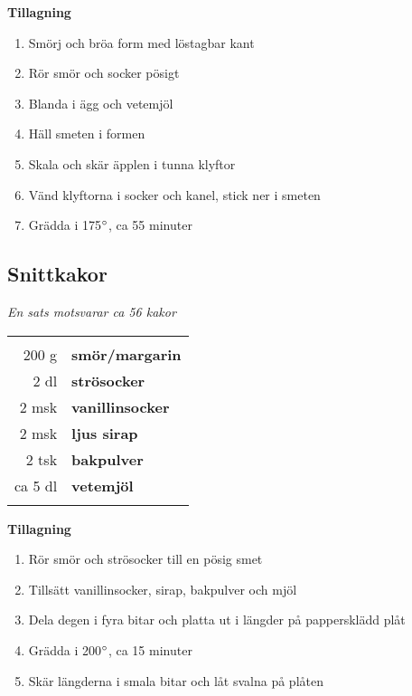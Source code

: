 \documentclass[a4paper,12pt]{article}
\newcommand{\sats}[1]{\noindent \textit{En sats motsvarar #1}}
\begin{document}
\begin{multicols*}{2}

\noindent \textbf{Tillagning}
\begin{enumerate}
	\itemsep0cm
	\item Smörj och bröa form med löstagbar kant
	\item Rör smör och socker pösigt
	\item Blanda i ägg och vetemjöl
	\item Häll smeten i formen
	\item Skala och skär äpplen i tunna klyftor
	\item Vänd klyftorna i socker och \mbox{kanel}, stick ner i smeten
	\item Grädda i 175$\degree$, ca 55 minuter
\end{enumerate}

\end{multicols*}

\clearpage

\subsection{Snittkakor}
\sats{ca 56 kakor}

\begin{table}[H]
	\begin{tabular}{rl}
	\hline
	&\\
		200 g & \textbf{smör/margarin}\\
		2 dl & \textbf{strösocker}\\
		2 msk & \textbf{vanillinsocker}\\
		2 msk & \textbf{ljus sirap}\\
		2 tsk & \textbf{bakpulver}\\
		ca 5 dl & \textbf{vetemjöl}\\
	&\\
	\hline
	\end{tabular}
\end{table}

\begin{multicols*}{2}

\noindent \textbf{Tillagning}
\begin{enumerate}
	\itemsep0cm
	\item Rör smör och strösocker till en pösig smet
	\item Tillsätt vanillinsocker, sirap, bakpulver och mjöl
	\item Dela degen i fyra bitar och \mbox{platta} ut i längder på pappersklädd plåt
	\item Grädda i 200$\degree$, ca 15 minuter
	\item Skär längderna i smala bitar och låt svalna på plåten
\end{enumerate}

\end{multicols*}
\end{document}
